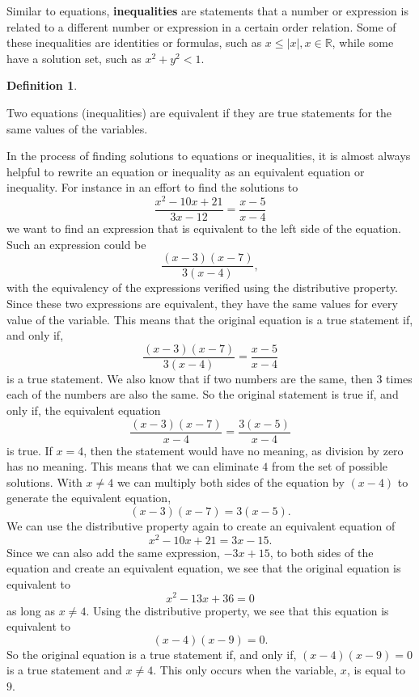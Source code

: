 \documentclass[
]{book}
\theoremstyle{definition}
\newtheorem{definition}{Definition}[chapter]
\theoremstyle{definition}
\theoremstyle{definition}
\theoremstyle{definition}
\theoremstyle{remark}
\begin{document}
Similar to equations, \textbf{inequalities} are statements that a number or expression is related to a different number or expression in a certain order relation. Some of these inequalities are identities or formulas, such as \(x\leq |x|, x\in\mathbb{R}\), while some have a solution set, such as \(x^2+y^2<1\).

\begin{definition}
\protect\hypertarget{def:unlabeled-div-27}{}\label{def:unlabeled-div-27}

Two equations (inequalities) are equivalent if they are true statements for the same values of the variables.

\end{definition}

In the process of finding solutions to equations or inequalities, it is almost always helpful to rewrite an equation or inequality as an equivalent equation or inequality. For instance in an effort to find the solutions to \[\frac{x^2-10x+21}{3x-12} = \frac{x-5}{x-4}\]
we want to find an expression that is equivalent to the left side of the equation. Such an expression could be \[\frac{(x-3)(x-7)}{3(x-4)},\] with the equivalency of the expressions verified using the distributive property. Since these two expressions are equivalent, they have the same values for every value of the variable. This means that the original equation is a true statement if, and only if, \[\frac{(x-3)(x-7)}{3(x-4)}=\frac{x-5}{x-4}\] is a true statement. We also know that if two numbers are the same, then \(3\) times each of the numbers are also the same. So the original statement is true if, and only if, the equivalent equation
\[\frac{(x-3)(x-7)}{x-4}=\frac{3(x-5)}{x-4}\] is true. If \(x=4\), then the statement would have no meaning, as division by zero has no meaning. This means that we can eliminate \(4\) from the set of possible solutions. With \(x\neq 4\) we can multiply both sides of the equation by \((x-4)\) to generate the equivalent equation, \[(x-3)(x-7)=3(x-5).\] We can use the distributive property again to create an equivalent equation of \[x^2-10x+21=3x-15.\] Since we can also add the same expression, \(-3x+15\), to both sides of the equation and create an equivalent equation, we see that the original equation is equivalent to \[x^2-13x+36=0\] as long as \(x\neq 4\). Using the distributive property, we see that this equation is equivalent to \[(x-4)(x-9)=0.\] So the original equation is a true statement if, and only if, \((x-4)(x-9)=0\) is a true statement and \(x\neq 4\). This only occurs when the variable, \(x\), is equal to \(9\).
\end{document}
